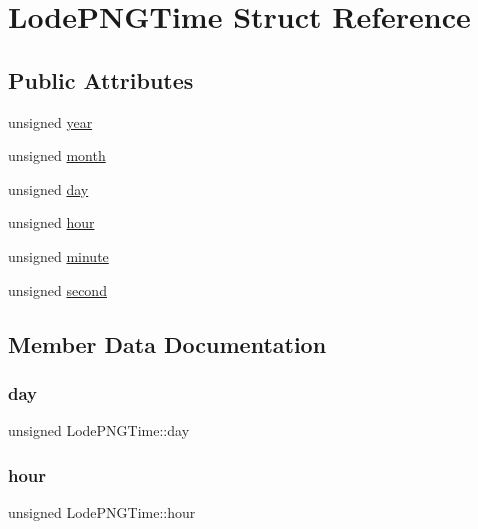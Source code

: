\hypertarget{struct_lode_p_n_g_time}{}\section{Lode\+P\+N\+G\+Time Struct Reference}
\label{struct_lode_p_n_g_time}
\subsection*{Public Attributes}
\begin{DoxyCompactItemize}
\item 
unsigned \mbox{\hyperlink{struct_lode_p_n_g_time_a32b68342f39f3d38ba91a721b1149b8f}{year}}
\item 
unsigned \mbox{\hyperlink{struct_lode_p_n_g_time_a295d890e862d5cd0c444e9d3a96fa9d5}{month}}
\item 
unsigned \mbox{\hyperlink{struct_lode_p_n_g_time_aa3dee3b7b3a1e730fbded7a7b8cf355e}{day}}
\item 
unsigned \mbox{\hyperlink{struct_lode_p_n_g_time_ac99cb7f3ce16a85f9f505b7f5f6e0aa7}{hour}}
\item 
unsigned \mbox{\hyperlink{struct_lode_p_n_g_time_ac3045de79728f29fc61f534b062e0f13}{minute}}
\item 
unsigned \mbox{\hyperlink{struct_lode_p_n_g_time_a6c691c5821e828488a8bb8a90751a2f0}{second}}
\end{DoxyCompactItemize}


\subsection{Member Data Documentation}
\mbox{\label{struct_lode_p_n_g_time_aa3dee3b7b3a1e730fbded7a7b8cf355e}} 
\subsubsection{\texorpdfstring{day}{day}}
{\footnotesize\ttfamily unsigned Lode\+P\+N\+G\+Time\+::day}

\mbox{\label{struct_lode_p_n_g_time_ac99cb7f3ce16a85f9f505b7f5f6e0aa7}} 
\subsubsection{\texorpdfstring{hour}{hour}}
{\footnotesize\ttfamily unsigned Lode\+P\+N\+G\+Time\+::hour}

